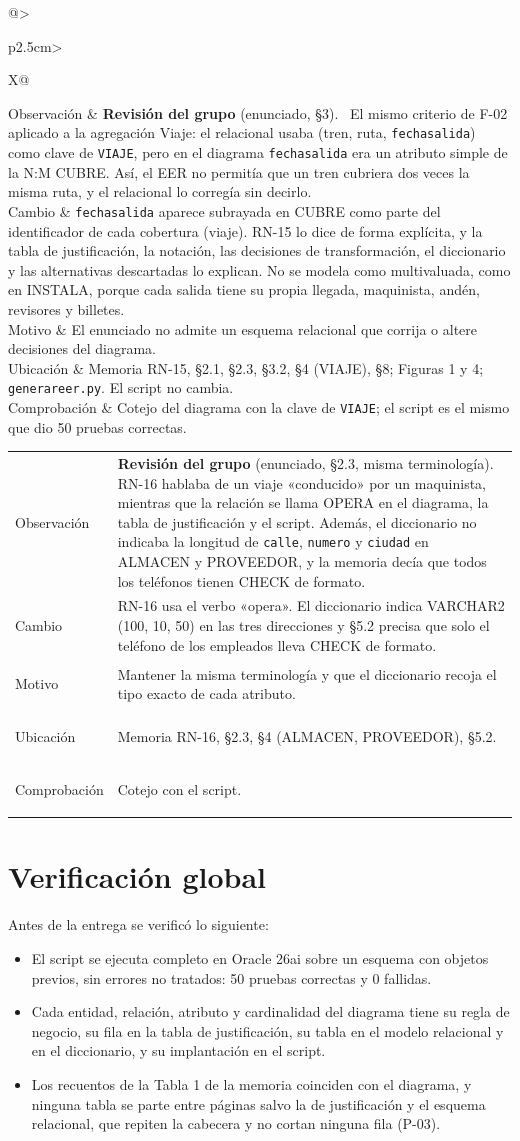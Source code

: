 \documentclass[11pt,a4paper]{article}
\makeatletter
\DeclareRobustCommand{\_}{\textunderscore\allowbreak}
\newcommand{\tb}[1]{\texttt{#1}}
\newcommand{\REV}[1]{\textbf{Revisión del grupo} (enunciado, #1).~}
\newcommand{\cambio}[7]{%
\begin{tcolorbox}[colback=white,colframe=azuluvigo,colbacktitle=azuluvigo!8,coltitle=azuluvigo,
  title={\textbf{#1}\quad #2},fonttitle=\normalsize,boxrule=0.6pt,arc=1mm,
  left=2mm,right=2mm,top=1mm,bottom=1mm,before skip=6pt,after skip=6pt]
\small
\begin{tabularx}{\linewidth}{@{}>{\bfseries\raggedright\arraybackslash}p{2.5cm}>{\raggedright\arraybackslash}X@{}}
Observación & #3\\
Cambio & #4\\
Motivo & #5\\
Ubicación & #6\\
Comprobación & #7\\
\end{tabularx}
\end{tcolorbox}}
\makeatother
\begin{document}
\cambio{F-11}{Fecha de salida como parte del identificador de CUBRE}
{\REV{§3} El mismo criterio de F-02 aplicado a la agregación Viaje: el relacional usaba (tren, ruta, \tb{fecha\_salida}) como clave de \tb{VIAJE}, pero en el diagrama \tb{fecha\_salida} era un atributo simple de la N:M CUBRE. Así, el EER no permitía que un tren cubriera dos veces la misma ruta, y el relacional lo corregía sin decirlo.}
{\tb{fecha\_salida} aparece subrayada en CUBRE como parte del identificador de cada cobertura (viaje). RN-15 lo dice de forma explícita, y la tabla de justificación, la notación, las decisiones de transformación, el diccionario y las alternativas descartadas lo explican. No se modela como multivaluada, como en INSTALA, porque cada salida tiene su propia llegada, maquinista, andén, revisores y billetes.}
{El enunciado no admite un esquema relacional que corrija o altere decisiones del diagrama.}
{Memoria RN-15, §2.1, §2.3, §3.2, §4 (VIAJE), §8; Figuras 1 y 4; \tb{generar\_eer.py}. El script no cambia.}
{Cotejo del diagrama con la clave de \tb{VIAJE}; el script es el mismo que dio 50 pruebas correctas.}

\cambio{F-12}{Terminología de RN-16 y precisiones del diccionario}
{\REV{§2.3, misma terminología} RN-16 hablaba de un viaje «conducido» por un maquinista, mientras que la relación se llama OPERA en el diagrama, la tabla de justificación y el script. Además, el diccionario no indicaba la longitud de \tb{calle}, \tb{numero} y \tb{ciudad} en ALMACEN y PROVEEDOR, y la memoria decía que todos los teléfonos tienen CHECK de formato.}
{RN-16 usa el verbo «opera». El diccionario indica VARCHAR2 (100, 10, 50) en las tres direcciones y §5.2 precisa que solo el teléfono de los empleados lleva CHECK de formato.}
{Mantener la misma terminología y que el diccionario recoja el tipo exacto de cada atributo.}
{Memoria RN-16, §2.3, §4 (ALMACEN, PROVEEDOR), §5.2.}
{Cotejo con el script.}

\section{Verificación global}
Antes de la entrega se verificó lo siguiente:
\begin{itemize}
\item El script se ejecuta completo en Oracle 26ai sobre un esquema con objetos previos, sin errores no tratados: 50 pruebas correctas y 0 fallidas.
\item Cada entidad, relación, atributo y cardinalidad del diagrama tiene su regla de negocio, su fila en la tabla de justificación, su tabla en el modelo relacional y en el diccionario, y su implantación en el script.
\item Los recuentos de la Tabla 1 de la memoria coinciden con el diagrama, y ninguna tabla se parte entre páginas salvo la de justificación y el esquema relacional, que repiten la cabecera y no cortan ninguna fila (P-03).
\end{itemize}
\end{document}
